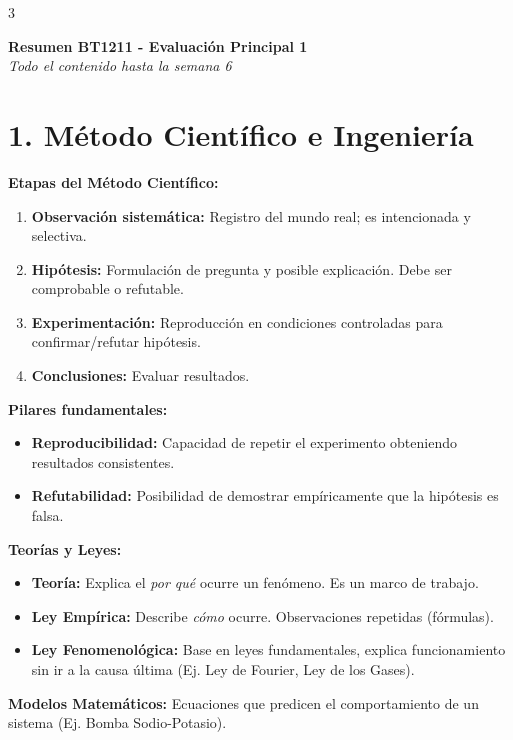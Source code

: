 \documentclass[9pt,letterpaper]{extarticle}
\begin{document}
\begin{multicols*}{3}

	\begin{center}
		\textbf{\LARGE Resumen BT1211 - Evaluación Principal 1} \\
		\textit{Todo el contenido hasta la semana 6}
	\end{center}

	\section*{1. Método Científico e Ingeniería}
	\textbf{Etapas del Método Científico:}
	\begin{enumerate}
		\item \textbf{Observación sistemática:} Registro del mundo real; es intencionada y selectiva.
		\item \textbf{Hipótesis:} Formulación de pregunta y posible explicación. Debe ser comprobable o refutable.
		\item \textbf{Experimentación:} Reproducción en condiciones controladas para confirmar/refutar hipótesis.
		\item \textbf{Conclusiones:} Evaluar resultados.
	\end{enumerate}
	\textbf{Pilares fundamentales:}
	\begin{itemize}
		\item \textbf{Reproducibilidad:} Capacidad de repetir el experimento obteniendo resultados consistentes.
		\item \textbf{Refutabilidad:} Posibilidad de demostrar empíricamente que la hipótesis es falsa.
	\end{itemize}
	\textbf{Teorías y Leyes:}
	\begin{itemize}
		\item \textbf{Teoría:} Explica el \textit{por qué} ocurre un fenómeno. Es un marco de trabajo.
		\item \textbf{Ley Empírica:} Describe \textit{cómo} ocurre. Observaciones repetidas (fórmulas).
		\item \textbf{Ley Fenomenológica:} Base en leyes fundamentales, explica funcionamiento sin ir a la causa última (Ej. Ley de Fourier, Ley de los Gases).
	\end{itemize}
	\textbf{Modelos Matemáticos:} Ecuaciones que predicen el comportamiento de un sistema (Ej. Bomba Sodio-Potasio).


\end{multicols*}
\end{document}
